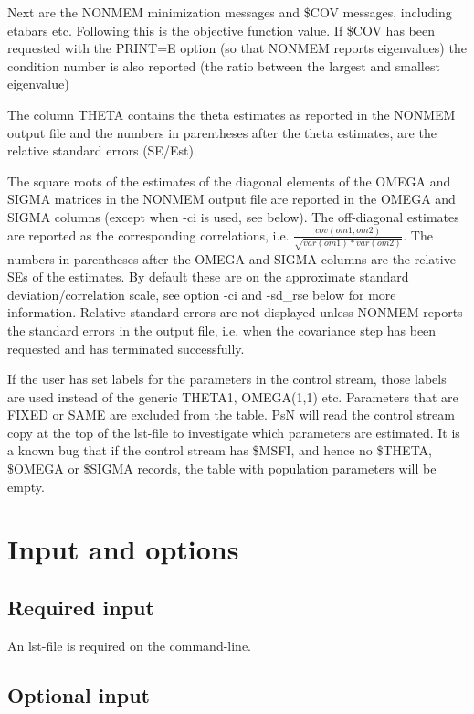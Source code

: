 Next are the NONMEM minimization messages and \$COV messages, including etabars etc. Following this is the objective function value. If \$COV has been requested with the PRINT=E option (so that NONMEM reports eigenvalues) the condition number is also reported (the ratio between the largest and smallest eigenvalue)

The column THETA contains the theta estimates as reported in the NONMEM output file and the numbers in parentheses after the theta estimates, are the relative standard errors (SE/Est). 

The square roots of the estimates of the diagonal elements of the OMEGA and SIGMA matrices in the NONMEM output file are reported in the OMEGA and SIGMA columns (except when -ci is used, see below). The off-diagonal estimates are reported as the corresponding correlations, i.e. 
$\frac{cov(om1,om2)}{\sqrt{var(om1)*var(om2)}}$. 
The numbers in parentheses after the OMEGA and SIGMA columns are the relative SEs of the estimates. By default these are on the approximate standard deviation/correlation scale, see option -ci and -sd\_rse below for more information.
Relative standard errors are not displayed unless NONMEM reports the standard errors in the output file, i.e. when the covariance step has been requested and has terminated successfully.

If the user has set labels for the parameters in the control stream, those labels are used instead of the
generic THETA1, OMEGA(1,1) etc. Parameters that are FIXED or SAME are excluded from the table.
PsN will read the control stream copy at the top of the lst-file to investigate which parameters are estimated. It is a known
bug that if the control stream has \$MSFI, and hence no \$THETA, \$OMEGA or \$SIGMA records, the table with population parameters will be empty.

\section{Input and options}

\subsection{Required input}
An lst-file is required on the command-line.

\subsection{Optional input}

